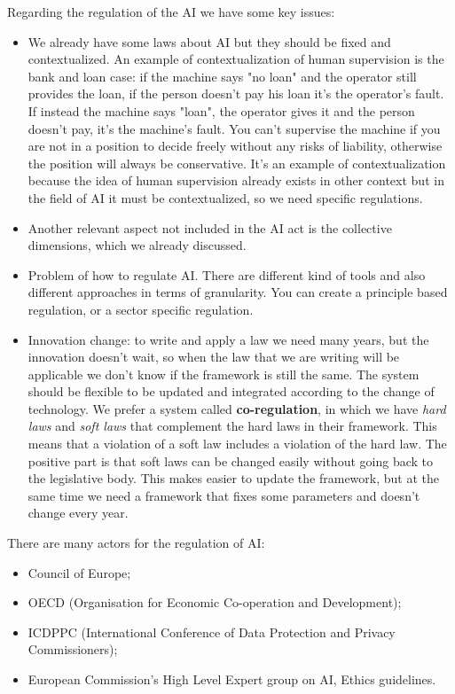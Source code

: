 Regarding the regulation of the AI we have some key issues:
\begin{itemize}
    \item We already have some laws about AI but they should be fixed and contextualized. An example of contextualization of human supervision is the bank and loan case: if the machine says "no loan" and the operator still provides the loan, if the person doesn't pay his loan it's the operator's fault. If instead the machine says "loan", the operator gives it and the person doesn't pay, it's the machine's fault. You can't supervise the machine if you are not in a position to decide freely without any risks of liability, otherwise the position will always be conservative. 
    It's an example of contextualization because the idea of human supervision already exists in other context but in the field of AI it must be contextualized, so we need specific regulations.
    \item Another relevant aspect not included in the AI act is the collective dimensions, which we already discussed.
    \item Problem of how to regulate AI. There are different kind of tools and also different approaches in terms of granularity. You can create a principle based regulation, or a sector specific regulation. 
    \item Innovation change: to write and apply a law we need many years, but the innovation doesn't wait, so when the law that we are writing will be applicable we don't know if the framework is still the same. The system should be flexible to be updated and integrated according to the change of technology. We prefer a system called \textbf{co-regulation}, in which we have \textit{hard laws} and \textit{soft laws} that complement the hard laws in their framework. This means that a violation of a soft law includes a violation of the hard law. The positive part is that soft laws can be changed easily without going back to the legislative body. This makes easier to update the framework, but at the same time we need a framework that fixes some parameters and doesn't change every year.
\end{itemize}

There are many actors for the regulation of AI:
\begin{itemize}
    \item Council of Europe;
    \item OECD (Organisation for Economic Co-operation and Development);
    \item ICDPPC (International Conference of Data Protection and Privacy Commissioners);
    \item European Commission's High Level Expert group on AI, Ethics guidelines. 
\end{itemize}

